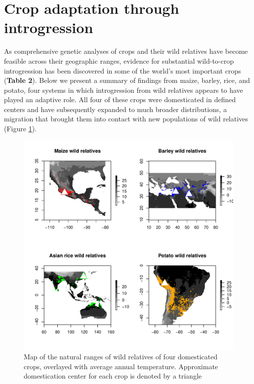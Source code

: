 \documentclass[11pt]{article}
\begin{document}
\section*{Crop adaptation through introgression}

As comprehensive genetic analyses of crops and their wild relatives have become feasible across their geographic ranges, evidence for substantial wild-to-crop introgression has been discovered in some of the world's most important crops (\textbf{Table 2}).
Below we present a summary of findings from maize, barley, rice, and potato, four systems in which introgression from wild relatives appears to have played an adaptive role.
All four of these crops were domesticated in defined centers and have subsequently expanded to much broader distributions, a migration that brought them into contact with new populations of wild relatives (Figure \ref{fig:map}).

\begin{figure}[h]
	\centering
	\includegraphics[width=15cm]{temperature_plot_degC.pdf}
	\caption{Map of the natural ranges of wild relatives of four domesticated crops, overlayed with average annual temperature. Approximate domestication center for each crop is denoted by a triangle}
	\label{fig:map}
\end{figure}
\end{document}
